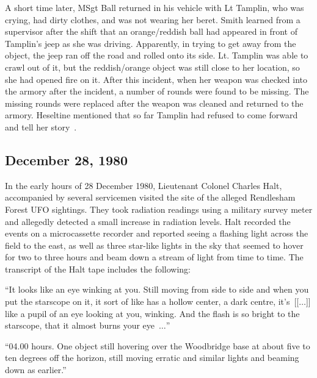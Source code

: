 A short time later, MSgt Ball returned in his vehicle with Lt Tamplin, who was crying, had dirty clothes, and was not wearing her beret.
Smith learned from a supervisor after the shift that an orange/reddish ball had appeared in front of Tamplin's jeep as she was driving.
Apparently, in trying to get away from the object, the jeep ran off the road and rolled onto its side. Lt.
Tamplin was able to crawl out of it, but the reddish/orange object was still close to her location, so she had opened fire on it.
After this incident, when her weapon was checked into the armory after the incident, a number of rounds were found to be missing.
The missing rounds were replaced after the weapon was cleaned and returned to the armory.
Heseltine mentioned that so far Tamplin had refused to come forward and tell her story~\cite{FleischerHeseltine2023April}.

\subsection{December 28, 1980}

In the early hours of 28 December 1980, Lieutenant Colonel Charles Halt,
accompanied by several servicemen visited the site of the alleged Rendlesham Forest UFO sightings.
They took radiation readings using a military survey meter and allegedly detected a small increase in radiation levels.
Halt recorded the events on a microcassette recorder and reported seeing a flashing light across the field to the east,
as well as three star-like lights in the sky that seemed
to hover for two to three hours and beam down a stream of light from time to time.
The transcript of the Halt tape includes the following:
\begin{svgraybox}
``It looks like an eye winking at you. Still moving from side to side and when you put the starscope on it, it sort of like has a hollow center,
a dark centre, it's~[[$\ldots$]] like a pupil of an eye looking at you, winking.
And the flash is so bright to the starscope, that it almost burns your eye~$\ldots$''

``04.00 hours. One object still hovering over the Woodbridge base at about five to ten degrees off the horizon,
still moving erratic and similar lights and beaming down as earlier.''
\end{svgraybox}

